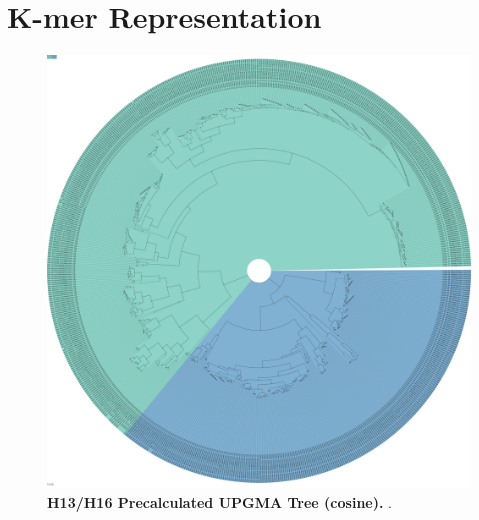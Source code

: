 \section{K-mer Representation} \label{sec:K_mer_Representation}

\blindtext




\begin{figure}[!hbt]
    \centering
    \includegraphics[width=\dimexpr\textwidth-2\fboxsep-2\fboxrule,fbox]{UMAP/Precalculated_Segment_4_H_Cosine.pdf}
    \caption[H13/H16 Precalculated \Acrshort{UPGMA} Tree (cosine)]{\textbf{H13/H16 Precalculated \Acrshort{UPGMA} Tree (cosine).} .}
    \label{fig:Precalculated_Cosine}
\end{figure}

